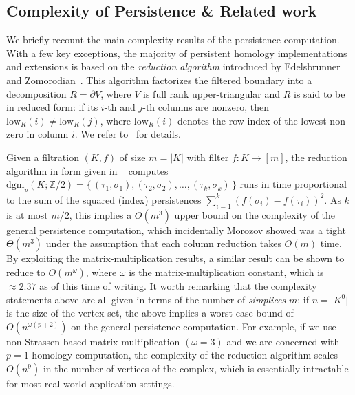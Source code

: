 \documentclass[10pt]{article}
\numberwithin{equation}{section}
\newcommand{\+}{%
	\raisebox{0.18ex}{\scaleobj{0.55}{+}}
}
\theoremstyle{definition}
\begin{document}
\subsection{Complexity of Persistence \& Related work}
We briefly recount the main complexity results of the persistence computation. 
With a few key exceptions, the majority of persistent homology implementations and extensions is based on the \emph{reduction algorithm} introduced by Edelsbrunner and Zomorodian~\cite{edelsbrunner2000topological}. 
This algorithm factorizes the filtered boundary into a decomposition $R = \partial V$, where $V$ is full rank upper-triangular and $R$ is said to be in reduced form: if its $i$-th and $j$-th columns are nonzero, then $\mathrm{low}_R(i) \neq \mathrm{low}_R(j)$, where $\mathrm{low}_R(i)$ denotes the row index of the lowest non-zero in column $i$. 
We refer to~\cite{edelsbrunner2000topological, bauer2020persistence, dey2022computational} for details. 

Given a filtration $(K, f)$ of size $m = \lvert K \rvert$ with filter $f : K \to [m]$, the reduction algorithm in form given in ~\cite{edelsbrunner2000topological} computes $\mathrm{dgm}_p(K; \mathbb{Z}/2) = \{ \, (\tau_1, \sigma_1), (\tau_2, \sigma_2), \dots, (\tau_k, \sigma_k) \, \}$ runs in time proportional to the sum of the squared (index) persistences $\sum_{i=1}^k (f(\sigma_i)-f(\tau_i))^2$. As $k$ is at most $m / 2$, this implies a $O(m^3)$ upper bound on the complexity of the general persistence computation, which incidentally Morozov showed was a tight $\Theta(m^3)$ under the assumption that each column reduction takes $O(m)$ time. 
By exploiting the matrix-multiplication results, a similar result can be shown to reduce to $O(m^\omega)$, where $\omega$ is the matrix-multiplication constant, which is $\approx 2.37$ as of this time of writing. 
It worth remarking that the complexity statements above are all given in terms of the number of \emph{simplices} $m$: if $n = \lvert K^0 \rvert$ is the size of the vertex set, the above implies a worst-case bound of $O(n^{\omega(p+2)})$ on the general persistence computation. For example, if we use non-Strassen-based matrix multiplication $(\omega = 3)$ and we are concerned with $p=1$ homology computation, the complexity of the reduction algorithm scales $O(n^9)$ in the number of vertices of the complex, which is essentially intractable for most real world application settings. 
\end{document}
